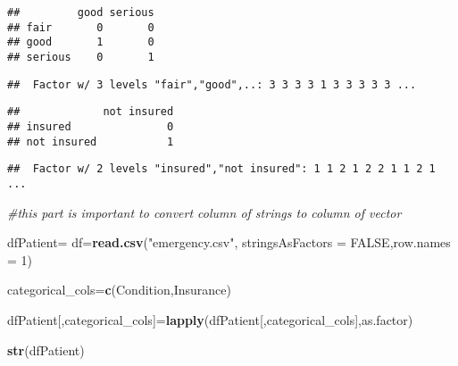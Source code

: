 \documentclass[
]{article}
\newenvironment{Shaded}{\begin{snugshade}}{\end{snugshade}}
\newcommand{\AttributeTok}[1]{\textcolor[rgb]{0.13,0.29,0.53}{#1}}
\newcommand{\CommentTok}[1]{\textcolor[rgb]{0.56,0.35,0.01}{\textit{#1}}}
\newcommand{\ConstantTok}[1]{\textcolor[rgb]{0.56,0.35,0.01}{#1}}
\newcommand{\DecValTok}[1]{\textcolor[rgb]{0.00,0.00,0.81}{#1}}
\newcommand{\FunctionTok}[1]{\textcolor[rgb]{0.13,0.29,0.53}{\textbf{#1}}}
\newcommand{\NormalTok}[1]{#1}
\newcommand{\OtherTok}[1]{\textcolor[rgb]{0.56,0.35,0.01}{#1}}
\newcommand{\SpecialCharTok}[1]{\textcolor[rgb]{0.81,0.36,0.00}{\textbf{#1}}}
\newcommand{\StringTok}[1]{\textcolor[rgb]{0.31,0.60,0.02}{#1}}
\begin{document}
\begin{verbatim}
##         good serious
## fair       0       0
## good       1       0
## serious    0       1
\end{verbatim}

\begin{Shaded}
\end{Shaded}

\begin{verbatim}
##  Factor w/ 3 levels "fair","good",..: 3 3 3 3 1 3 3 3 3 3 ...
\end{verbatim}

\begin{Shaded}
\end{Shaded}

\begin{verbatim}
##             not insured
## insured               0
## not insured           1
\end{verbatim}

\begin{Shaded}
\end{Shaded}

\begin{verbatim}
##  Factor w/ 2 levels "insured","not insured": 1 1 2 1 2 2 1 1 2 1 ...
\end{verbatim}

\begin{Shaded}
\begin{Highlighting}[]
\CommentTok{\#this part is important to convert column of strings to column of vector}

\NormalTok{dfPatient}\OtherTok{=}\NormalTok{ df}\OtherTok{=}\FunctionTok{read.csv}\NormalTok{(}\StringTok{"emergency.csv"}\NormalTok{, }\AttributeTok{stringsAsFactors =} \ConstantTok{FALSE}\NormalTok{,}\AttributeTok{row.names =} \DecValTok{1}\NormalTok{)}

\NormalTok{categorical\_cols}\OtherTok{=}\FunctionTok{c}\NormalTok{(}\StringTok{\textquotesingle{}Condition\textquotesingle{}}\NormalTok{,}\StringTok{\textquotesingle{}Insurance\textquotesingle{}}\NormalTok{)}

\NormalTok{dfPatient[,categorical\_cols]}\OtherTok{=}\FunctionTok{lapply}\NormalTok{(dfPatient[,categorical\_cols],as.factor)}

\FunctionTok{str}\NormalTok{(dfPatient)}
\end{Highlighting}
\end{Shaded}
\end{document}
